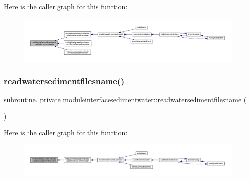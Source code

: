 Here is the caller graph for this function\+:\nopagebreak
\begin{figure}[H]
\begin{center}
\leavevmode
\includegraphics[width=350pt]{namespacemoduleinterfacesedimentwater_a23d9e5cbe8c23621607cbca34d93c7f0_icgraph}
\end{center}
\end{figure}
\mbox{\label{namespacemoduleinterfacesedimentwater_a11b9e14e9187da0c2c8bc38302ec8e95}} 
\subsubsection{\texorpdfstring{readwatersedimentfilesname()}{readwatersedimentfilesname()}}
{\footnotesize\ttfamily subroutine, private moduleinterfacesedimentwater\+::readwatersedimentfilesname (\begin{DoxyParamCaption}{ }\end{DoxyParamCaption})\hspace{0.3cm}{\ttfamily [private]}}

Here is the caller graph for this function\+:\nopagebreak
\begin{figure}[H]
\begin{center}
\leavevmode
\includegraphics[width=350pt]{namespacemoduleinterfacesedimentwater_a11b9e14e9187da0c2c8bc38302ec8e95_icgraph}
\end{center}
\end{figure}
\mbox{\label{namespacemoduleinterfacesedimentwater_af31617d2ab88d4aceb9dd0edcac94ff2}} 
